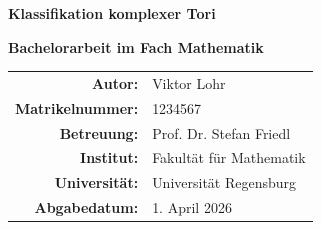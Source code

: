 
\newcommand{\makemytitle}{
	\begin{titlepage}
			\centering
			
			{\Huge\bfseries \color{black} Klassifikation komplexer Tori \par}
			\vspace{1cm}
			\vfill
			
			{\large\bfseries Bachelorarbeit im Fach Mathematik\par}
			\vfill
			
			\begin{tabular}{rl}
			\textbf{Autor:} & Viktor Lohr \\[0.3cm]
			\textbf{Matrikelnummer:} & 1234567 \\[0.3cm]
			\textbf{Betreuung:} & Prof. Dr. Stefan Friedl \\[0.3cm]
			\textbf{Institut:} & Fakultät für Mathematik\\[0.3cm]
			\textbf{Universität:} & Universität Regensburg \\[0.3cm]
			\textbf{Abgabedatum:} & 1. April 2026 \\
			\end{tabular}
			
			\vfill
	\end{titlepage}
}
\makemytitle
